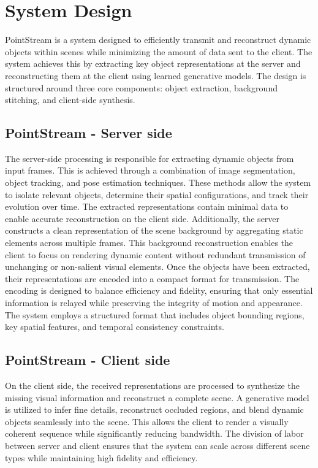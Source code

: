 \documentclass[sigconf, screen, review, anonymous]{acmart}
\begin{document}
\newpage
\section{System Design}
PointStream is a system designed to efficiently transmit and reconstruct dynamic objects within scenes while minimizing the amount of data sent to the client. The system achieves this by extracting key object representations at the server and reconstructing them at the client using learned generative models. The design is structured around three core components: object extraction, background stitching, and client-side synthesis.

\subsection{PointStream - Server side}
The server-side processing is responsible for extracting dynamic objects from input frames. This is achieved through a combination of image segmentation, object tracking, and pose estimation techniques. These methods allow the system to isolate relevant objects, determine their spatial configurations, and track their evolution over time. The extracted representations contain minimal  data to enable accurate reconstruction on the client side. Additionally, the server constructs a clean representation of the scene background by aggregating static elements across multiple frames. This background reconstruction enables the client to focus on rendering dynamic content without redundant transmission of unchanging or non-salient visual elements.
Once the objects have been extracted, their representations are encoded into a compact format for transmission. The encoding is designed to balance efficiency and fidelity, ensuring that only essential information is relayed while preserving the integrity of motion and appearance. The system employs a structured format that includes object bounding regions, key spatial features, and temporal consistency constraints.

\subsection{PointStream - Client side}
On the client side, the received representations are processed to synthesize the missing visual information and reconstruct a complete scene. A generative model is utilized to infer fine details, reconstruct occluded regions, and blend dynamic objects seamlessly into the scene. This allows the client to render a visually coherent sequence while significantly reducing bandwidth.
The division of labor between server and client ensures that the system can scale across different scene types while maintaining high fidelity and efficiency.
\end{document}
